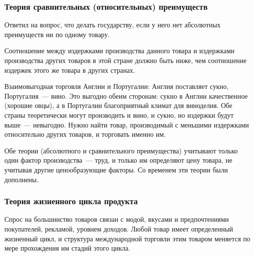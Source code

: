 \documentclass[12pt]{article}
\begin{document}
    \subsubsection{Теория сравнительных (относительных) преимуществ}
    
    \begin{person}
    	Ответил на вопрос, что делать государству, если у него нет абсолютных преимуществ ни по одному товару.
    \end{person}
    
    \begin{definition}
    	Соотношение между издержками производства данного товара и издержками производства других товаров в этой стране должно быть ниже, чем соотношение издержек этого же товара в других странах.
    \end{definition}
    
    \begin{note}[Пример]
    	Взаимовыгодная торговля Англии и Португалии: Англия поставляет сукно, Португалия~--- вино. Это выгодно обеим сторонам: сукно в Англии качественное (хорошие овцы), а в Португалии благоприятный климат для виноделия. Обе страны теоретически могут производить и вино, и сукно, но издержки будут выше~--- невыгодно. Нужно найти товар, производимый с меньшими издержками относительно других товаров, и торговать именно им.
    \end{note}
    
    \begin{note}
    	Обе теории (абсолютного и сравнительного преимущества) учитывают только один фактор производства~--- труд, и только им определяют цену товара, не учитывая другие ценообразующие факторы. Со временем эти теории были дополнены.
    \end{note}
    
    \subsubsection{Теория жизненного цикла продукта}
    
    \begin{person}
    	Спрос на большинство товаров связан с модой, вкусами и предпочтениями покупателей, рекламой, уровнем доходов. Любой товар имеет определенный жизненный цикл, и структура международной торговли этим товаром меняется по мере прохождения им стадий этого цикла.
    \end{person}
    
\end{document}
